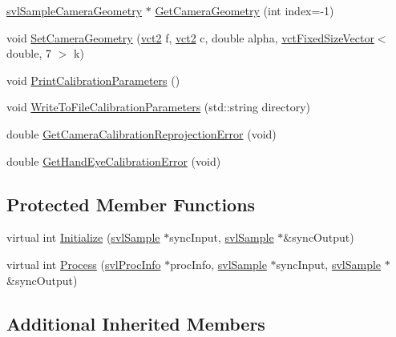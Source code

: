 \begin{DoxyCompactItemize}
\hyperlink{classsvl_sample_camera_geometry}{svl\+Sample\+Camera\+Geometry} $\ast$ \hyperlink{classsvl_filter_image_camera_calibration_open_c_v_a4c4b476c5c28daec797bd78759fc7f9b}{Get\+Camera\+Geometry} (int index=-\/1)
\item 
void \hyperlink{classsvl_filter_image_camera_calibration_open_c_v_a4d87d92e044f8a35b52b5eee82f9d7f8}{Set\+Camera\+Geometry} (\hyperlink{vct_fixed_size_vector_types_8h_a88481ac3c794867ba5e4e92624f0d958}{vct2} f, \hyperlink{vct_fixed_size_vector_types_8h_a88481ac3c794867ba5e4e92624f0d958}{vct2} c, double alpha, \hyperlink{classvct_fixed_size_vector}{vct\+Fixed\+Size\+Vector}$<$ double, 7 $>$ k)
\item 
void \hyperlink{classsvl_filter_image_camera_calibration_open_c_v_a5a2229d318fead587ba2b10b863cb446}{Print\+Calibration\+Parameters} ()
\item 
void \hyperlink{classsvl_filter_image_camera_calibration_open_c_v_ab1021bb36cc7f4ec92aef1899cfaa0a5}{Write\+To\+File\+Calibration\+Parameters} (std\+::string directory)
\item 
double \hyperlink{classsvl_filter_image_camera_calibration_open_c_v_aa62a80f133b42334a6b00c707efd3936}{Get\+Camera\+Calibration\+Reprojection\+Error} (void)
\item 
double \hyperlink{classsvl_filter_image_camera_calibration_open_c_v_a5cc9b1de3d14ba9e496e7d534c9b8ae7}{Get\+Hand\+Eye\+Calibration\+Error} (void)
\end{DoxyCompactItemize}
\subsection*{Protected Member Functions}
\begin{DoxyCompactItemize}
\item 
virtual int \hyperlink{classsvl_filter_image_camera_calibration_open_c_v_a29c2a251abd92cd6fe11202be06425e2}{Initialize} (\hyperlink{classsvl_sample}{svl\+Sample} $\ast$sync\+Input, \hyperlink{classsvl_sample}{svl\+Sample} $\ast$\&sync\+Output)
\item 
virtual int \hyperlink{classsvl_filter_image_camera_calibration_open_c_v_aa2154ceaf88e6888d205a5a5cac3f8ce}{Process} (\hyperlink{structsvl_proc_info}{svl\+Proc\+Info} $\ast$proc\+Info, \hyperlink{classsvl_sample}{svl\+Sample} $\ast$sync\+Input, \hyperlink{classsvl_sample}{svl\+Sample} $\ast$\&sync\+Output)
\end{DoxyCompactItemize}
\subsection*{Additional Inherited Members}



